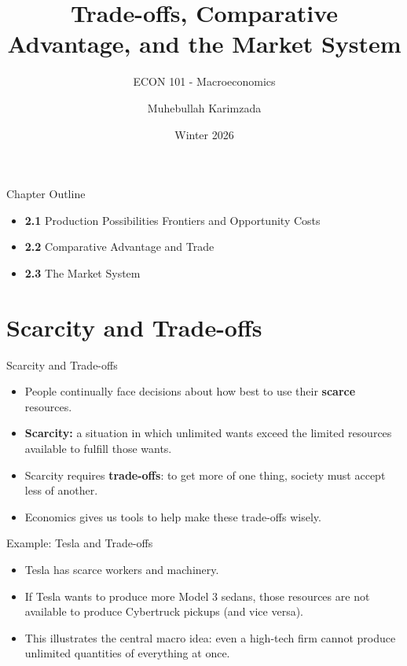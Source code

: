 \documentclass[aspectratio=169]{beamer}
\title{\textbf{Trade-offs, Comparative Advantage, and the Market System \vspace{.5cm}\\  }}
\subtitle{ {\large ECON 101 - Macroeconomics}}
\author{Muhebullah Karimzada}
\date{Winter 2026}
\begin{document}
\begin{frame}[plain]
  \titlepage
\end{frame}

\begin{frame}{Chapter Outline}
\transfade
\begin{itemize}[<+->]
  \item \textbf{2.1} Production Possibilities Frontiers and Opportunity Costs
  \item \textbf{2.2} Comparative Advantage and Trade
  \item \textbf{2.3} The Market System
\end{itemize}
\end{frame}

\section{Scarcity and Trade-offs}

\begin{frame}{Scarcity and Trade-offs}
\transfade
\begin{itemize}[<+->]
  \item People continually face decisions about how best to use their \textbf{scarce} resources.
  \item \textbf{Scarcity:} a situation in which unlimited wants exceed the limited resources available to fulfill those wants.
  \item Scarcity requires \textbf{trade-offs}: to get more of one thing, society must accept less of another.
  \item Economics gives us tools to help make these trade-offs wisely.
\end{itemize}
\end{frame}

\begin{frame}{Example: Tesla and Trade-offs}
\transfade
\begin{itemize}[<+->]
  \item Tesla has scarce workers and machinery.
  \item If Tesla wants to produce more Model 3 sedans, those resources are not available to produce Cybertruck pickups (and vice versa).
  \item This illustrates the central macro idea: even a high-tech firm cannot produce unlimited quantities of everything at once.
\end{itemize}
\end{frame}
\end{document}
